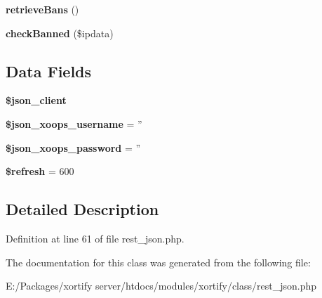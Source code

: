 \begin{DoxyCompactItemize}
\item 
\hypertarget{class_r_e_s_t___j_s_o_n_xortify_exchange_a4af29af927aae9aada97ef0c2cd08fa1}{{\bfseries retrieve\-Bans} ()}\label{class_r_e_s_t___j_s_o_n_xortify_exchange_a4af29af927aae9aada97ef0c2cd08fa1}

\item 
\hypertarget{class_r_e_s_t___j_s_o_n_xortify_exchange_ae41df0f26620b727f7f63342648f6474}{{\bfseries check\-Banned} (\$ipdata)}\label{class_r_e_s_t___j_s_o_n_xortify_exchange_ae41df0f26620b727f7f63342648f6474}

\end{DoxyCompactItemize}
\subsection*{Data Fields}
\begin{DoxyCompactItemize}
\item 
\hypertarget{class_r_e_s_t___j_s_o_n_xortify_exchange_a2d091f9d959cab9ac28ad2cc96149447}{{\bfseries \$json\-\_\-client}}\label{class_r_e_s_t___j_s_o_n_xortify_exchange_a2d091f9d959cab9ac28ad2cc96149447}

\item 
\hypertarget{class_r_e_s_t___j_s_o_n_xortify_exchange_ac058687d82a56fb93513e7e58c4ec391}{{\bfseries \$json\-\_\-xoops\-\_\-username} = ''}\label{class_r_e_s_t___j_s_o_n_xortify_exchange_ac058687d82a56fb93513e7e58c4ec391}

\item 
\hypertarget{class_r_e_s_t___j_s_o_n_xortify_exchange_a7af311f07c1c09254920e6ac0cefe9a9}{{\bfseries \$json\-\_\-xoops\-\_\-password} = ''}\label{class_r_e_s_t___j_s_o_n_xortify_exchange_a7af311f07c1c09254920e6ac0cefe9a9}

\item 
\hypertarget{class_r_e_s_t___j_s_o_n_xortify_exchange_a8527f826b6959aaa92b0e51ee427ba1a}{{\bfseries \$refresh} = 600}\label{class_r_e_s_t___j_s_o_n_xortify_exchange_a8527f826b6959aaa92b0e51ee427ba1a}

\end{DoxyCompactItemize}


\subsection{Detailed Description}


Definition at line 61 of file rest\-\_\-json.\-php.



The documentation for this class was generated from the following file\-:\begin{DoxyCompactItemize}
\item 
E\-:/\-Packages/xortify server/htdocs/modules/xortify/class/rest\-\_\-json.\-php\end{DoxyCompactItemize}
